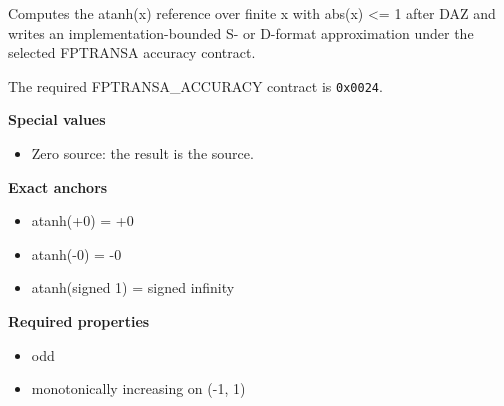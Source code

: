 Computes the atanh(x) reference over finite x with abs(x) \textless{}= 1 after DAZ and writes an implementation-bounded S- or D-format approximation under the selected FPTRANSA accuracy contract.

The required FPTRANSA\_ACCURACY contract is \texttt{0x0024}.

\textbf{Special values}\par
\begin{itemize}
\item Zero source: the result is the source.
\end{itemize}

\textbf{Exact anchors}\par
\begin{itemize}
\item atanh(+0) = +0
\item atanh(-0) = -0
\item atanh(signed 1) = signed infinity
\end{itemize}

\textbf{Required properties}\par
\begin{itemize}
\item odd
\item monotonically increasing on (-1, 1)
\end{itemize}
